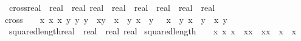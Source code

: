 \begin{isabellebody}
\isanewline
{}\isamarkupfalse%
\ cross{\isacharcolon}{\kern0pt}{\isacharcolon}{\kern0pt}{\isachardoublequoteopen}{\isacharparenleft}{\kern0pt}real\ {\isasymtimes}\ real\ {\isasymtimes}\ real{\isacharparenright}{\kern0pt}\ {\isasymRightarrow}{\isacharparenleft}{\kern0pt}real\ {\isasymtimes}\ real\ {\isasymtimes}\ real{\isacharparenright}{\kern0pt}\ {\isasymRightarrow}\ {\isacharparenleft}{\kern0pt}real\ {\isasymtimes}\ real\ {\isasymtimes}\ real{\isacharparenright}{\kern0pt}{\isachardoublequoteclose}\ \ \isanewline
{\isachardoublequoteopen}cross\ {\isacharequal}{\kern0pt}\ \ {\isacharparenleft}{\kern0pt}{\isasymlambda}\ {\isacharparenleft}{\kern0pt}x{}{\isacharcomma}{\kern0pt}\ x{}{\isacharcomma}{\kern0pt}\ x{}{\isacharparenright}{\kern0pt}\ {\isacharparenleft}{\kern0pt}y{}{\isacharcomma}{\kern0pt}\ y{}{\isacharcomma}{\kern0pt}\ y{}{\isacharparenright}{\kern0pt}\ {\isachardot}{\kern0pt}\ {\isacharparenleft}{\kern0pt}x{}{\isacharasterisk}{\kern0pt}y{}\ {\isacharminus}{\kern0pt}\ x{}\ {\isacharasterisk}{\kern0pt}\ y{}{\isacharcomma}{\kern0pt}\ x{}\ {\isacharasterisk}{\kern0pt}\ y{}\ \ {\isacharminus}{\kern0pt}\ x{}\ {\isacharasterisk}{\kern0pt}\ y{}{\isacharcomma}{\kern0pt}\ x{}\ {\isacharasterisk}{\kern0pt}\ y{}\ {\isacharminus}{\kern0pt}\ x{}{\isacharasterisk}{\kern0pt}\ y{}{\isacharparenright}{\kern0pt}{\isacharparenright}{\kern0pt}{\isachardoublequoteclose}\isanewline
\isanewline
\ \isanewline
{}\isamarkupfalse%
\ squared{\isacharunderscore}{\kern0pt}length{\isacharcolon}{\kern0pt}{\isacharcolon}{\kern0pt}{\isachardoublequoteopen}{\isacharparenleft}{\kern0pt}real\ {\isasymtimes}\ real\ {\isasymtimes}\ real{\isacharparenright}{\kern0pt}\ {\isasymRightarrow}real{\isachardoublequoteclose}\ \isanewline
{\isachardoublequoteopen}squared{\isacharunderscore}{\kern0pt}length\ {\isacharequal}{\kern0pt}\ \ {\isacharparenleft}{\kern0pt}{\isasymlambda}\ {\isacharparenleft}{\kern0pt}x{}{\isacharcomma}{\kern0pt}\ x{}{\isacharcomma}{\kern0pt}\ x{}{\isacharparenright}{\kern0pt}\ {\isachardot}{\kern0pt}\ {\isacharparenleft}{\kern0pt}x{}{\isacharasterisk}{\kern0pt}x{}\ {\isacharplus}{\kern0pt}\ x{}{\isacharasterisk}{\kern0pt}x{}\ {\isacharplus}{\kern0pt}\ x{}\ {\isacharasterisk}{\kern0pt}\ x{}{\isacharparenright}{\kern0pt}{\isacharparenright}{\kern0pt}{\isachardoublequoteclose}\isanewline

\end{isabellebody}
